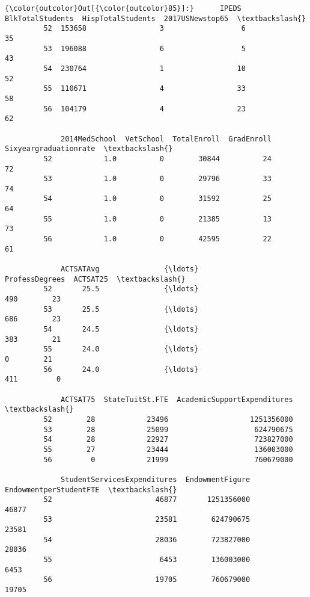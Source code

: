 \documentclass[11pt]{article}
\begin{document}
\begin{Verbatim}[commandchars=\\\{\}]
{\color{outcolor}Out[{\color{outcolor}85}]:}      IPEDS  BlkTotalStudents  HispTotalStudents  2017USNewstop65  \textbackslash{}
         52  153658                 3                  6               35   
         53  196088                 6                  5               43   
         54  230764                 1                 10               52   
         55  110671                 4                 33               58   
         56  104179                 4                 23               62   
         
             2014MedSchool  VetSchool  TotalEnroll  GradEnroll  Sixyeargraduationrate  \textbackslash{}
         52            1.0          0        30844          24                     72   
         53            1.0          0        29796          33                     74   
         54            1.0          0        31592          25                     64   
         55            1.0          0        21385          13                     73   
         56            1.0          0        42595          22                     61   
         
             ACTSATAvg               {\ldots}                 ProfessDegrees  ACTSAT25  \textbackslash{}
         52       25.5               {\ldots}                            490        23   
         53       25.5               {\ldots}                            686        23   
         54       24.5               {\ldots}                            383        21   
         55       24.0               {\ldots}                              0        21   
         56       24.0               {\ldots}                            411         0   
         
             ACTSAT75  StateTuitSt.FTE  AcademicSupportExpenditures  \textbackslash{}
         52        28            23496                   1251356000   
         53        28            25099                    624790675   
         54        28            22927                    723827000   
         55        27            23444                    136003000   
         56         0            21999                    760679000   
         
             StudentServicesExpenditures  EndowmentFigure  EndowmentperStudentFTE  \textbackslash{}
         52                        46877       1251356000                   46877   
         53                        23581        624790675                   23581   
         54                        28036        723827000                   28036   
         55                         6453        136003000                    6453   
         56                        19705        760679000                   19705   
         

\end{Verbatim}
\end{document}
